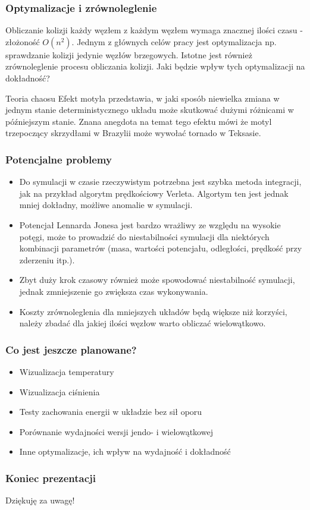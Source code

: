 \documentclass{beamer}
\begin{document}
\begin{frame}
    \frametitle{Optymalizacje i zrównoleglenie}

    Obliczanie kolizji każdy węzłem z każdym węzłem wymaga znacznej ilości czasu - złożoność $O(n^2)$.
    Jednym z głównych celów pracy jest optymalizacja np. sprawdzanie kolizji jedynie węzłów brzegowych.
    Istotne jest również zrównoleglenie procesu obliczania kolizji.
    Jaki będzie wpływ tych optymalizacji na dokładność?

    \begin{block}{Teoria chaosu}
        Efekt motyla przedstawia, w jaki sposób niewielka zmiana w jednym stanie
        deterministycznego układu może skutkować dużymi różnicami w późniejszym stanie.
        Znana anegdota na temat tego efektu mówi że motyl trzepoczący skrzydłami w Brazylii może wywołać tornado w Teksasie.
    \end{block}
\end{frame}

\begin{frame}
    \frametitle{Potencjalne problemy}

    \begin{itemize}
        \item Do symulacji w czasie rzeczywistym potrzebna jest szybka metoda integracji, jak na przykład algorytm prędkościowy Verleta.
              Algortym ten jest jednak mniej dokładny, możliwe anomalie w symulacji.
        \item Potencjał Lennarda Jonesa jest bardzo wrażliwy ze względu na wysokie potęgi, może to prowadzić do
              niestabilności symulacji dla niektórych kombinacji parametrów (masa, wartości potencjału, odległości, prędkość przy zderzeniu itp.).
        \item Zbyt duży krok czasowy również może spowodować niestabilność symulacji, jednak zmniejszenie go zwiększa czas wykonywania.
        \item Koszty zrównoleglenia dla mniejszych układów będą większe niż korzyści,
              należy zbadać dla jakiej ilości węzłow warto obliczać wielowątkowo.
    \end{itemize}
\end{frame}

\begin{frame}
    \frametitle{Co jest jeszcze planowane?}
    \begin{itemize}
        \item Wizualizacja temperatury
        \item Wizualizacja ciśnienia
        \item Testy zachowania energii w układzie bez sił oporu
        \item Porównanie wydajności wersji jendo- i wielowątkowej
        \item Inne optymalizacje, ich wpływ na wydajność i dokładność
    \end{itemize}
\end{frame}


\begin{frame}
    \frametitle{Koniec prezentacji}

    \centering
    \LARGE Dziękuję za uwagę!
\end{frame}
\end{document}
